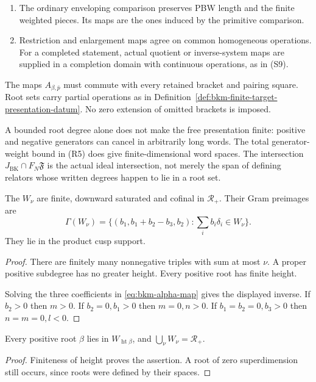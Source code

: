 \begin{definition}
\begin{enumerate}
finite enlargement containing its intermediate degrees.
\item[\textup{(R7)}] The ordinary enveloping comparison preserves
PBW length and the finite weighted pieces. Its maps are the ones
induced by the primitive comparison.
\item[\textup{(R8)}] Restriction and enlargement maps agree on
common homogeneous operations. For a completed statement, actual
quotient or inverse-system maps are supplied in a completion domain
with continuous operations, as in (S9).
\end{enumerate}
The maps $A_{\beta,\bar p}$ must commute with every retained bracket
and pairing square. Root sets carry partial operations as in
Definition~\ref{def:bkm-finite-target-presentation-datum}. No
zero extension of omitted brackets is imposed.
\end{definition}

A bounded root degree alone does not make the free presentation
finite: positive and negative generators can cancel in arbitrarily
long words. The total generator-weight bound in (R5) does give
finite-dimensional word spaces. The intersection
$J_{\mathrm{BK}}\cap F_N\mathfrak F$ is the actual ideal
intersection, not merely the span of defining relators whose
written degrees happen to lie in a root set.

\begin{proposition}
\label{prop:height-root-windows-gamma}
The $W_\nu$ are finite, downward saturated and cofinal in
$\mathcal R_+$. Their Gram preimages are
\[
 \Gamma(W_\nu)=
 \{(b_1,b_1+b_2-b_3,b_2):\textstyle\sum_i b_i\delta_i\in W_\nu\}.
\]
They lie in the product cusp support.
\end{proposition}
\begin{proof}
There are finitely many nonnegative triples with sum at most $\nu$.
A proper positive subdegree has no greater height. Every positive
root has finite height.

Solving the three coefficients in
\eqref{eq:bkm-alpha-map} gives the displayed inverse.
If $b_2>0$ then $m>0$. If $b_2=0,b_1>0$ then $m=0,n>0$.
If $b_1=b_2=0,b_3>0$ then $n=m=0,l<0$.
\end{proof}

\begin{corollary}
\label{prop:active-root-window-exhaustion}
Every positive root $\beta$ lies in $W_{\operatorname{ht}\beta}$,
and $\bigcup_\nu W_\nu=\mathcal R_+$.
\end{corollary}
\begin{proof}
Finiteness of height proves the assertion. A root of zero
superdimension still occurs, since roots were defined by their spaces.
\end{proof}

